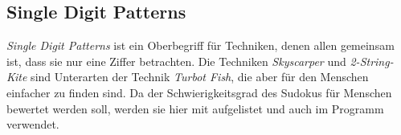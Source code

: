 \newpage
\subsection{Single Digit Patterns}
\textit{Single Digit Patterns} ist ein Oberbegriff für Techniken, denen allen gemeinsam ist, dass sie nur eine Ziffer betrachten. Die Techniken \textit{Skyscarper} und \textit{2-String-Kite} sind Unterarten der Technik \textit{Turbot Fish}, die aber für den Menschen einfacher zu finden sind. Da der Schwierigkeitsgrad des Sudokus für Menschen bewertet werden soll, werden sie hier mit aufgelistet und auch im Programm verwendet.